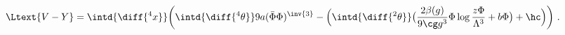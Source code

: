 \begin{equation}
  \label{eq:vylagrangian}
  \Ltext{V-Y} = \intd{\diff{^4x}}  \biggl( \intd{\diff{^4 \theta}} 9 a (\bar{\Phi} \Phi)^{\inv{3}} -
  \Bigl(\intd{\diff{^2 \theta}} \bigl(\frac{2 \beta(g)}{9 \cg g^3} \Phi \log
  \frac{z \Phi}{\Lambda^3} + b \Phi \bigr)  + \hc \Bigr) \biggr) \ .
\end{equation}

